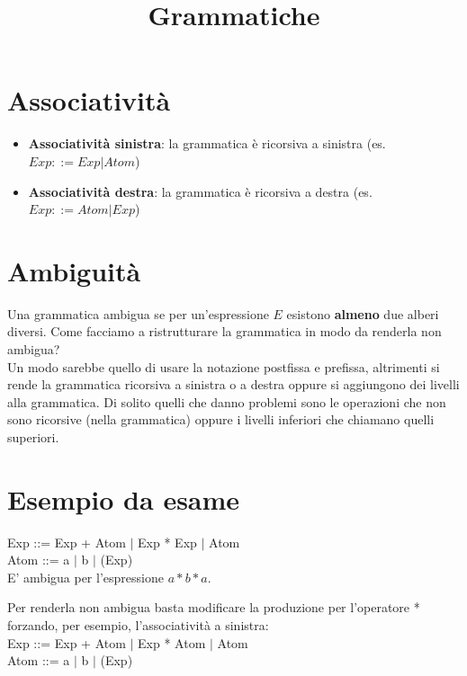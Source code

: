 \documentclass[10pt]{article}
\title{Grammatiche}
\author{}
\date{}
\begin{document}
\maketitle
\section{Associatività}
\begin{itemize}
    \item \textbf{Associatività sinistra}: la grammatica è ricorsiva a sinistra (es. $Exp::= Exp|Atom$)
    \item \textbf{Associatività destra}: la grammatica è ricorsiva a destra (es. $Exp::= Atom|Exp$)
\end{itemize}
\section{Ambiguità}
Una grammatica ambigua se per un'espressione $E$ esistono \textbf{almeno} due alberi diversi.
Come facciamo a ristrutturare la grammatica in modo da renderla non ambigua?\\
Un modo sarebbe quello di usare la notazione postfissa e prefissa, altrimenti si rende la grammatica ricorsiva a sinistra o a destra oppure si aggiungono dei livelli alla grammatica. Di solito quelli che danno problemi sono le operazioni che non sono ricorsive (nella grammatica) oppure i livelli inferiori che chiamano quelli superiori.
\section{Esempio da esame}
Exp ::= Exp + Atom $|$ Exp * Exp $|$ Atom\\
Atom ::= a $|$ b $|$ (Exp)\\
E' ambigua per l'espressione $a*b*a$.
\begin{center}
\end{center}
Per renderla non ambigua basta modificare la produzione per  l'operatore * forzando, per esempio, l'associatività a sinistra:\\
Exp ::= Exp + Atom $|$ Exp * Atom $|$ Atom\\
Atom ::= a $|$ b $|$ (Exp)
\end{document}
